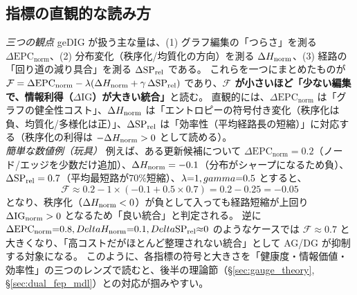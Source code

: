 \documentclass[ja=standard,xelatex]{bxjsarticle}
\newcommand{\F}{\mathcal{F}}
\newcommand{\gednorm}{\Delta\mathrm{EPC}_{\mathrm{norm}}}
\begin{document}
\subsection{指標の直観的な読み方}
\noindent\textit{三つの観点}\; geDIG が扱う主な量は、(1) グラフ編集の「つらさ」を測る $\gednorm$、(2) 分布変化（秩序化/均質化の方向）を測る $\Delta H_{\rm norm}$、(3) 経路の「回り道の減り具合」を測る $\Delta\mathrm{SP}_{\rm rel}$ である。
これらを一つにまとめたものが $\F=\gednorm-\lambda(\Delta H_{\rm norm}+\gamma\,\Delta\mathrm{SP}_{\rm rel})$ であり、\textbf{$\F$ が小さいほど「少ない編集で、情報利得（$\Delta\mathrm{IG}$）が大きい統合」}と読む。
直観的には、$\gednorm$ は「グラフの健全性コスト」、$\Delta H_{\rm norm}$ は「エントロピーの符号付き変化（秩序化は負、均質化/多様化は正）」、$\Delta\mathrm{SP}_{\rm rel}$ は「効率性（平均経路長の短縮）」に対応する（秩序化の利得は $-\Delta H_{\rm norm}>0$ として読める）。
\\
\noindent\textit{簡単な数値例（玩具）}\; 例えば、ある更新候補について $\gednorm=0.2$（ノード/エッジを少数だけ追加）、$\Delta H_{\rm norm}=-0.1$（分布がシャープになるため負）、$\Delta\mathrm{SP}_{\rm rel}=0.7$（平均最短路が70\%短縮）、$\lambda{=}1,\\gamma{=}0.5$ とすると、
\[
  \F \approx 0.2 - 1\times(-0.1+0.5\times0.7)=0.2-0.25=-0.05
\]
となり、秩序化（$\Delta H_{\rm norm}<0$）が負として入っても経路短縮が上回り $\Delta\mathrm{IG}_{\rm norm}>0$ となるため「良い統合」と判定される。
逆に $\gednorm{=}0.8,\\Delta H_{\rm norm}{=}0.1,\\Delta\mathrm{SP}_{\rm rel}{\approx}0$ のようなケースでは $\F{\approx}0.7$ と大きくなり、「高コストだがほとんど整理されない統合」として AG/DG が抑制する対象になる。
このように、各指標の符号と大きさを「健康度・情報価値・効率性」の三つのレンズで読むと、後半の理論節（\S\ref{sec:gauge_theory}, \S\ref{sec:dual_fep_mdl}）との対応が掴みやすい。
\end{document}
